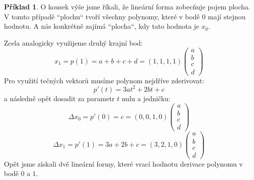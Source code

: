 \documentclass[a5paper,12pt]{amsbook}
\theoremstyle{definition}
\newtheorem{example}{Příklad}[chapter]
\begin{document}
\begin{example}
O kousek výše jsme říkali, že lineární forma zobecňuje pojem plocha. V tomto případě ``plochu`` tvoří
všechny polynomy, které v bodě $0$ mají stejnou hodnotu. A nás konkrétně zajímá ``plocha``, kdy tato
hodnota je $x_0$.

Zcela analogicky využijeme druhý krajní bod:
\begin{equation*}
x_1 = p(1) = a + b + c + d = \left(1, 1, 1, 1\right)\left(\begin{array}{c}
a\\
b\\
c\\
d
\end{array}\right)
\end{equation*}
Pro využití tečných vektorů musíme polynom nejdříve zderivovat:
\begin{equation*}
p'(t)=3at^2 + 2bt + c
\end{equation*}
a následně opět dosadit za parametr $t$ nulu a jedničku:
\begin{equation*}
\Delta x_0 = p'(0) = c = \left(0, 0, 1, 0\right)\left(\begin{array}{c}
a\\
b\\
c\\
d
\end{array}\right)
\end{equation*}
\begin{equation*}
\Delta x_1 = p'(1) = 3a + 2b + c = \left(3, 2, 1, 0\right)\left(\begin{array}{c}
a\\
b\\
c\\
d
\end{array}\right)
\end{equation*}
Opět jsme získali dvě lineární formy, které vrací hodnotu derivace polynomu v bodě $0$ a $1$.


\end{example}
\end{document}
